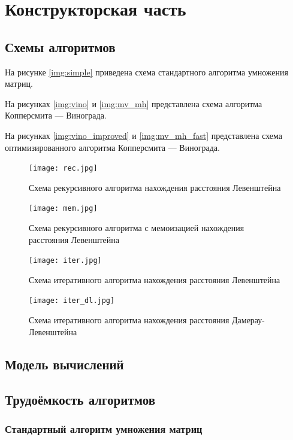\documentclass[12pt]{report}
\begin{document}
\chapter{Конструкторская часть}

\section{Схемы алгоритмов}

На рисунке \ref{img:simple} приведена схема стандартного алгоритма умножения матриц.


На рисунках \ref{img:vino} и \ref{img:mv_mh} представлена схема алгоритма Копперсмита — Винограда.

На рисунках \ref{img:vino_improved} и \ref{img:mv_mh_fast} представлена схема оптимизированного алгоритма Копперсмита — Винограда.

\begin{figure}[h]
	\centering
	\texttt{[image: rec.jpg]}
	\caption{Схема рекурсивного алгоритма нахождения расстояния Левенштейна}
	\label{fig:mpr}
\end{figure}

\begin{figure}[h]
	\centering
	\texttt{[image: mem.jpg]}
	\caption{Схема рекурсивного алгоритма с мемоизацией нахождения расстояния Левенштейна}
	\label{fig:mpr}
\end{figure}

\begin{figure}[h]
	\centering
	\texttt{[image: iter.jpg]}
	\caption{Схема итеративного алгоритма нахождения расстояния Левенштейна}
	\label{fig:mpr}
\end{figure}

\begin{figure}[h]
	\centering
	\texttt{[image: iter\_dl.jpg]}
	\caption{Схема итеративного алгоритма нахождения расстояния Дамерау-Левенштейна}
	\label{fig:mpr}
\end{figure}

\section{Модель вычислений}

\section{Трудоёмкость алгоритмов}

\subsection{Стандартный алгоритм умножения матриц}
\end{document}
